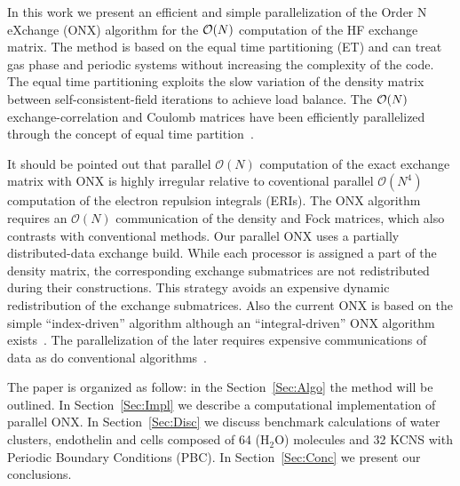 \documentclass[prl,twocolumn,twocolumngrid,superbib]{revtex4}
\begin{document}
 In this work we present an efficient and simple parallelization
 of the Order N eXchange (ONX) algorithm for the ${\cal O}(N)$ computation 
 of the HF exchange matrix. The method
 is based on the equal time partitioning (ET) and can treat gas phase and periodic systems 
 without increasing the complexity of the code. The equal time partitioning exploits 
 the slow variation of the density matrix between self-consistent-field iterations
 to achieve load balance. The ${\cal O}(N)$ exchange-correlation and Coulomb matrices
 have been efficiently parallelized through the concept of equal time
 partition~\cite{CGan03,CGan04B}.

 It should be pointed out that parallel $\mathcal{O}(N)$ computation
 of the exact exchange matrix with ONX is highly irregular relative 
 to coventional parallel $\mathcal{O}(N^4)$ computation of the electron repulsion integrals (ERIs).
 The ONX algorithm requires an $\mathcal{O}(N)$ communication of the 
 density and Fock matrices, which also contrasts with conventional methods.
 Our parallel ONX uses a partially distributed-data exchange build. While each processor 
 is assigned a part of the density matrix, the corresponding exchange submatrices are not redistributed during
 their constructions. This strategy avoids an expensive dynamic redistribution 
 of the exchange submatrices. 
 Also the current ONX is based on the simple ``index-driven'' algorithm although
 an ``integral-driven'' ONX algorithm exists~\cite{ESchwegler00}.
 The parallelization of the later requires expensive communications of data
 as do conventional algorithms~\cite{HTakashima02}.


 The paper is organized as follow: in the Section~\ref{Sec:Algo} the method
 will be outlined.
 In Section~\ref{Sec:Impl} we describe a computational implementation 
 of parallel ONX. In Section~\ref{Sec:Disc} we discuss benchmark calculations of 
 water clusters, endothelin and cells composed of 64
 (H$_2$O) molecules and 32 KCNS with Periodic Boundary Conditions (PBC).    
 In Section~\ref{Sec:Conc} we present our conclusions.


\end{document}
